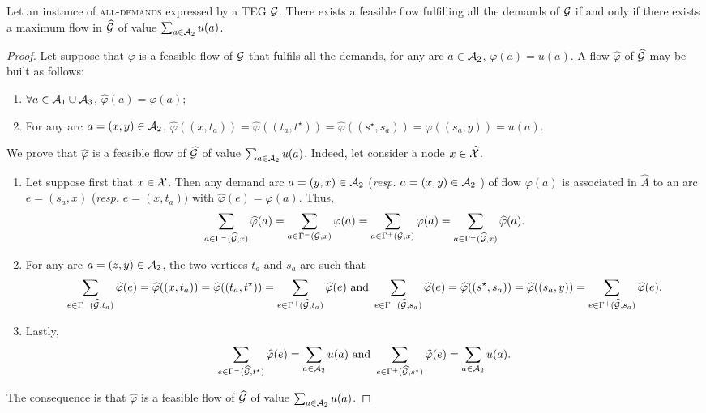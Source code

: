 \begin{bibunit}[ieeetr]
\begin{theorem}\label{theo:pol}
Let an instance of \textsc{all-demands} expressed by a TEG ${\cal G}$.
There exists a feasible flow fulfilling all the demands of ${\cal G}$ if and only if there exists a maximum flow in $\widehat{\cal G}$ of value $\sum_{a\in {\cal A}_2} u(a)$. 
\end{theorem}
\begin{proof}
Let suppose that $\varphi$ is a feasible flow of ${\cal G}$ that fulfils all the demands, \ie for any arc $a\in {\cal A}_2$, $\varphi(a)=u(a)$.
A flow $\widehat{\varphi}$ of $\widehat{\cal G}$ may be built as follows:
\begin{enumerate}
\item
$\forall a\in {\cal A}_1 \cup {\cal A}_3$, 
$\widehat{\varphi}(a)=\varphi(a)$;
\item
For any arc $a=(x,y)\in {\cal A}_2$, 
$\widehat{\varphi}((x,t_a))=\widehat{\varphi}((t_a,t^\star))=\widehat{\varphi}((s^\star, s_a))=\widehat{\varphi}( (s_a,y))=u(a)$.
\end{enumerate}
We prove that $\widehat\varphi$ is a feasible flow of $\widehat{\cal G}$ of value $\sum_{a\in {\cal A}_2} u(a)$. 
Indeed, let consider a node $x\in \widehat{\cal X}$.
\begin{enumerate}
\item Let suppose first that $x\in {\cal X}$. Then any demand arc $a=(y,x)\in {\cal A}_2$ ({\em resp.} $a=(x,y)\in {\cal A}_2$ ) of flow $\varphi(a)$ is associated in $\widehat{A}$ to an
arc $e=(s_a, x)$ ({\em resp.} $e=(x,t_a))$  with $\widehat{\varphi}(e)=\varphi(a)$. 
Thus, 
$$\sum_{a \in \Gamma^-({\widehat{\cal G}},x)} \widehat{\varphi}(a)=
\sum_{a \in \Gamma^-({\cal G},x)} \varphi(a)=\sum_{a \in \Gamma^+({\cal G},x)} \varphi(a)=
\sum_{a \in \Gamma^+({\widehat{\cal G}},x)} \widehat{\varphi}(a)\text{.}$$
\item
For any arc $a=(z,y)\in {\cal A}_2$, the two vertices $t_a$ and $s_a$ are such that
$$\sum_{e \in \Gamma^-({\widehat{\cal G}},t_a)} \widehat{\varphi}(e)=\widehat{\varphi}((x,t_a))=\widehat{\varphi}((t_a, t^\star))=\sum_{e \in \Gamma^+({\widehat{\cal G}}, t_a)} \widehat{\varphi}(e)
\mbox{ and }
 \sum_{e \in \Gamma^-({\widehat{\cal G}},s_a)} \widehat{\varphi}(e)=\widehat{\varphi}((s^\star,s_a))=\widehat{\varphi}((s_a, y))=\sum_{e \in \Gamma^+({\widehat{\cal G}},s_a)} \widehat{\varphi}(e)\text{.}$$
\item
Lastly, $$\sum_{e \in \Gamma^-({\widehat{\cal G}},t^\star)} \widehat{\varphi}(e)=\sum_{a\in {\cal A}_2} u(a)
\mbox{ and } \sum_{e \in \Gamma^+({\widehat{\cal G}},s^\star)} \widehat{\varphi}(e)=\sum_{a\in {\cal A}_2} u(a)\text{.}$$
\end{enumerate}
The consequence is that $\widehat\varphi$ is a feasible flow of $\widehat{\cal G}$ of value $\sum_{a\in {\cal A}_2} u(a)$. 


\end{proof}
\end{bibunit}
